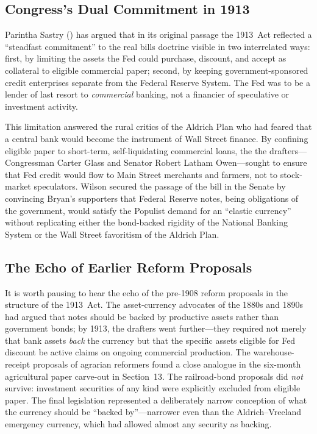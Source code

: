 \documentclass[12pt]{article}
\begin{document}
\subsection{Congress's Dual Commitment in 1913}

Parintha Sastry (\citeyear{sastry2018}) has argued that in its original passage the
1913~Act reflected a ``steadfast commitment'' to the real bills doctrine visible in
two interrelated ways: first, by limiting the assets the Fed could purchase, discount,
and accept as collateral to eligible commercial paper; second, by keeping
government-sponsored credit enterprises separate from the Federal Reserve System.
The Fed was to be a lender of last resort to \emph{commercial} banking, not a
financier of speculative or investment activity.

This limitation answered the rural critics of the Aldrich Plan who had feared that
a central bank would become the instrument of Wall Street finance.  By
confining eligible paper to short-term, self-liquidating commercial loans, the
the drafters---Congressman Carter Glass and Senator Robert Latham Owen---sought to
ensure that Fed credit would flow to Main Street merchants and farmers, not to
stock-market speculators.  Wilson secured the passage of the bill in the Senate by
convincing Bryan's supporters that Federal Reserve notes, being obligations of the
government, would satisfy the Populist demand for an ``elastic currency'' without
replicating either the bond-backed rigidity of the National Banking System or the
Wall Street favoritism of the Aldrich Plan.

\subsection{The Echo of Earlier Reform Proposals}

It is worth pausing to hear the echo of the pre-1908 reform proposals in the
structure of the 1913~Act.  The asset-currency advocates of the 1880s and 1890s
had argued that notes should be backed by productive assets rather than government
bonds; by 1913, the drafters went further---they required not merely that bank
assets \emph{back} the currency but that the specific assets eligible for Fed
discount be active claims on ongoing commercial production.  The warehouse-receipt
proposals of agrarian reformers found a close analogue in the six-month agricultural
paper carve-out in Section~13.  The railroad-bond proposals did \emph{not} survive:
investment securities of any kind were explicitly excluded from eligible paper.
The final legislation represented a deliberately narrow conception of what the
currency should be ``backed by''---narrower even than the Aldrich--Vreeland
emergency currency, which had allowed almost any security as backing.
\end{document}
